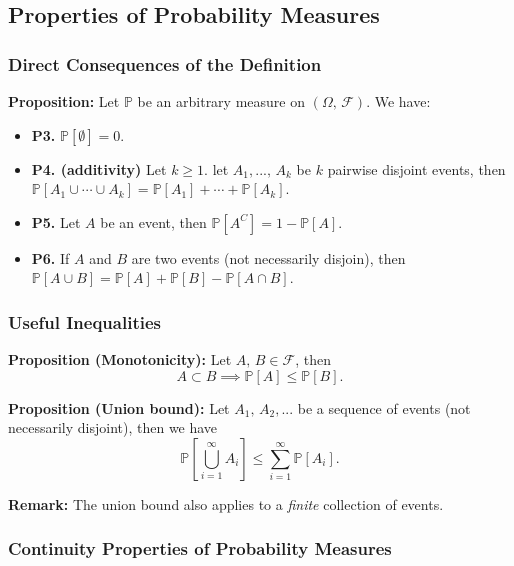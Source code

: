 \documentclass[a4paper]{extarticle}
\begin{document}
\subsection{Properties of Probability Measures}

\subsubsection{Direct Consequences of the Definition}

\begin{tbox}
    \textbf{Proposition:} Let \(\mathbb{P}\) be an arbitrary measure on \((\Omega, \, \mathcal{F})\). We have:

    \begin{itemize}
        \item \textbf{P3.} \(\mathbb{P}[\emptyset] = 0\).
        \item \textbf{P4. (additivity)} Let \(k \geq 1\). let \(A_1,..., \, A_k\) be \(k\) pairwise disjoint events, then \(\mathbb{P}[A_1 \cup \cdots \cup A_k] = \mathbb{P}[A_1] + \cdots + \mathbb{P}[A_k]\).
        \item \textbf{P5.} Let \(A\) be an event, then \(\mathbb{P}[A^C] = 1 - \mathbb{P}[A]\).
        \item \textbf{P6.} If \(A\) and \(B\) are two events (not necessarily disjoin), then \(\mathbb{P}[A \cup B] = \mathbb{P}[A] + \mathbb{P}[B] - \mathbb{P}[A \cap B]\).
    \end{itemize}
\end{tbox}

\subsubsection{Useful Inequalities}

\textbf{Proposition (Monotonicity):} Let \(A, \, B \in \mathcal{F}\), then
\[
    A \subset B \implies \mathbb{P}[A] \leq \mathbb{P}[B].
\]

\textbf{Proposition (Union bound):} Let \(A_1, \, A_2,...\) be a sequence of events (not necessarily disjoint), then we have
\[
    \mathbb{P}[\bigcup_{i = 1}^{\infty} A_i] \leq \sum_{i = 1}^{\infty} \mathbb{P}[A_i].
\]

\textbf{Remark:} The union bound also applies to a \textit{finite} collection of events.

\subsubsection{Continuity Properties of Probability Measures}
\end{document}
